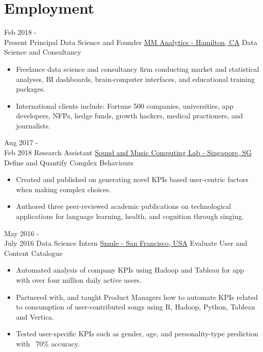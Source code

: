 \documentclass[letterpaper]{twentysecondcv} %
\newcommand{\Triangle}{\ding{228}}
\begin{document}
\section{Employment}
\begin{twenty} %
	\expitem
    	{Feb 2018 - \\Present}
        {Principal Data Science and Founder}
        {\href{https://www.linkedin.com/in/michael-mustaine/}{MM Analytics - Hamilton, CA}}
        {Data Science and Consultancy}
        {\begin{itemize}[label=\Triangle,noitemsep]
            \item Freelance data science and consultancy ﬁrm conducting market and statistical analyses, BI dashboards, brain-computer interfaces, and educational training packages.
            \item International clients include: Fortune 500 companies, universities, app developers, NFPs, hedge funds, growth hackers, medical practioners, and journalists. 
        \end{itemize}}

	\expitem
    	{Aug 2017 - \\Feb 2018}
        {Research Assistant}
        {\href{https://www.smcnus.org/}{Sound and Music Computing Lab - Singapore, SG}}
        {Define and Quantify Complex Behaviours}
        {\begin{itemize}[label=\Triangle,noitemsep]
            \item Created and published on generating novel KPIs based user-centric factors when making complex choices.
            \item Authored three peer-reviewed academic publications on technological applications for language learning, health, and cognition through singing.
        \end{itemize}}

	\expitem
    	{May 2016 - \\July 2016}
        {Data Science Intern}
        {\href{https://www.smule.com/}{Smule - San Francisco, USA}}
        {Evaluate User and Content Catalogue}
        {
        {\begin{itemize}[label=\Triangle,notiemsep]
            \item Automated analysis of company KPIs using Hadoop and Tableau for app with over four million daily active users.
            \item Partnered with, and taught Product Managers how to automate KPIs related to consumption of user-contributed songs using R, Hadoop, Python, Tableau and Vertica.
            \item Tested user-specific KPIs such as gender, age, and personality-type prediction with ~70\% accuracy.
        \end{itemize}}
        }


\end{twenty}
\end{document}
